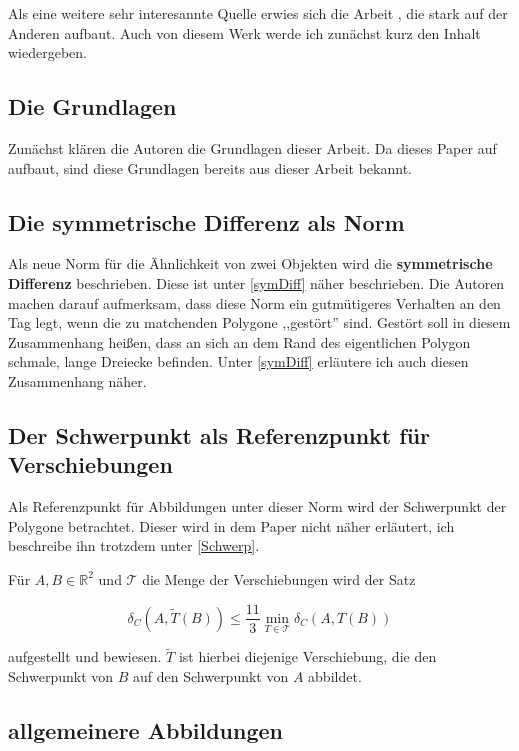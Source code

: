 Als eine weitere sehr interesannte Quelle erwies sich die Arbeit \cite{AFRW}, die stark auf der Anderen aufbaut. Auch von diesem Werk werde ich zunächst kurz den Inhalt wiedergeben.

\subsection{Die Grundlagen}

Zunächst klären die Autoren die Grundlagen dieser Arbeit. Da dieses Paper auf \cite{AAR} aufbaut, sind diese Grundlagen bereits aus dieser Arbeit bekannt. 

\subsection{Die symmetrische Differenz als Norm}

Als neue Norm für die Ähnlichkeit von zwei Objekten wird die \textbf{symmetrische Differenz} beschrieben. Diese ist unter  \ref{symDiff} näher beschrieben. Die Autoren machen darauf aufmerksam, dass diese Norm ein gutmütigeres Verhalten an den Tag legt, wenn die zu matchenden Polygone ,,gestört'' sind. Gestört soll in diesem Zusammenhang heißen, dass an sich an dem Rand des eigentlichen Polygon schmale, lange Dreiecke befinden. Unter \ref{symDiff} erläutere ich auch diesen Zusammenhang näher.

\subsection{Der Schwerpunkt als Referenzpunkt für Verschiebungen}

Als Referenzpunkt für Abbildungen unter dieser Norm wird der Schwerpunkt der Polygone betrachtet. Dieser wird in dem Paper  nicht näher erläutert, ich beschreibe ihn trotzdem unter \ref{Schwerp}. 

Für $A, B \in \mathbb{R}^2$ und $\mathcal{T}$ die Menge der Verschiebungen wird der Satz

$$\delta_C (A,\tilde{T}(B))\leq\frac{11}{3}\min_{T\in\mathcal{T}}\delta_C(A,T(B))$$


aufgestellt und bewiesen. $\tilde{T}$ ist hierbei diejenige Verschiebung, die den Schwerpunkt von $B$ auf den Schwerpunkt von $A$ abbildet.

\subsection{allgemeinere Abbildungen}

